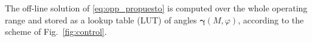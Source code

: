 \documentclass[conference]{IEEEtran}
\newcommand{\gv}{\boldsymbol{\gamma}}
\begin{document}
The off-line solution of \eqref{eq:opp_propuesto} is computed over the whole
operating range and stored as a lookup table (LUT) of angles $\gv(M, \varphi ) $,
according to the scheme of Fig.~\ref{fig:control}.

\end{document}
